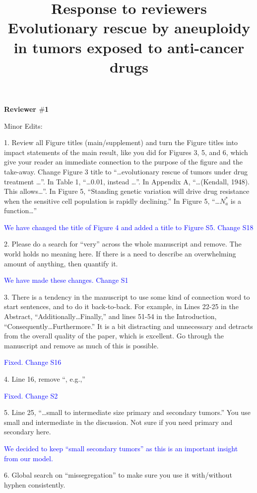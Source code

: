 \documentclass[12pt]{extarticle}
\title{
	Response to reviewers\\ Evolutionary rescue by aneuploidy in tumors exposed to anti-cancer drugs 
}
\begin{document}
\maketitle

\textbf{Reviewer $\#$1}

Minor Edits:

1. Review all Figure titles (main/supplement) and turn the Figure titles into impact statements of the main result, like you did for Figures 3, 5, and 6, which give your reader an immediate connection to the purpose of the figure and the take-away. Change Figure 3 title to ``\ldots evolutionary rescue of tumors under drug treatment \ldots''. In Table 1, ``\ldots 0.01, instead \dots''. In Appendix A, ``\ldots (Kendall, 1948). This allows\ldots''. In Figure 5, ``Standing genetic variation will drive drug resistance when the sensitive cell population is rapidly declining.'' In Figure 5, ``\ldots $N_a^*$ is a function\ldots''

\textcolor{blue}{We have changed the title of Figure 4 and added a title to Figure S5. Change S18}

2. Please do a search for ``very'' across the whole manuscript and remove. The world holds no meaning here. If there is a need to describe an overwhelming amount of anything, then quantify it. 

\textcolor{blue}{We have made these changes. Change S1}

3. There is a tendency in the manuscript to use some kind of connection word to start sentences, and to do it back-to-back. For example, in Lines 22-25 in the Abstract, ``Additionally\ldots Finally,'' and lines 51-54 in the Introduction, ``Consequently\ldots Furthermore.'' It is a bit distracting and unnecessary and detracts from the overall quality of the paper, which is excellent. Go through the manuscript and remove as much of this is possible.

\textcolor{blue}{Fixed. Change S16}

4. Line 16, remove ``, e.g.,''

\textcolor{blue}{Fixed. Change S2}

5. Line 25, ``\ldots small to intermediate size primary and secondary tumors.'' You use small and intermediate in the discussion. Not sure if you need primary and secondary here.

\textcolor{blue}{We decided to keep ``small secondary tumors'' as this is an important insight from our model.} 

6. Global search on ``missegregation'' to make sure you use it with/without hyphen consistently.
\end{document}

